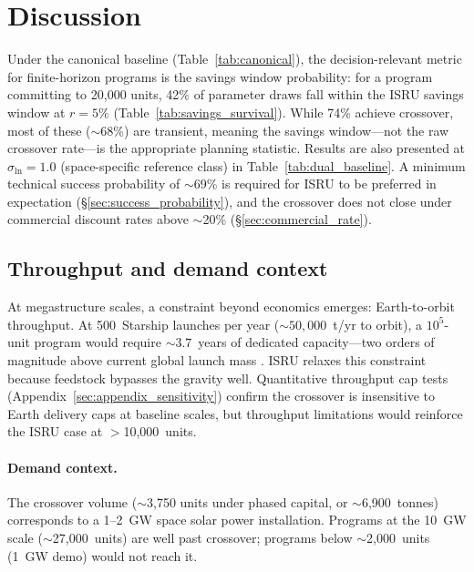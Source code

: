 \documentclass[preprint,12pt]{elsarticle}
\begin{document}
\section{Discussion}
\label{sec:discussion}

Under the canonical baseline (Table~\ref{tab:canonical}), the decision-relevant metric for finite-horizon programs is the savings window probability: for a program committing to 20{,}000 units, 42\% of parameter draws fall within the ISRU savings window at $r = 5\%$ (Table~\ref{tab:savings_survival}). While 74\% achieve crossover, most of these (${\sim}$68\%) are transient, meaning the savings window---not the raw crossover rate---is the appropriate planning statistic. Results are also presented at $\sigma_{\ln} = 1.0$ (space-specific reference class) in Table~\ref{tab:dual_baseline}. A minimum technical success probability of $\sim$69\% is required for ISRU to be preferred in expectation (\S\ref{sec:success_probability}), and the crossover does not close under commercial discount rates above $\sim$20\% (\S\ref{sec:commercial_rate}).

\subsection{Throughput and demand context}
\label{sec:throughput}

At megastructure scales, a constraint beyond economics emerges: Earth-to-orbit throughput. At 500~Starship launches per year (${\sim}50{,}000$~t/yr to orbit), a $10^5$-unit program would require ${\sim}3.7$~years of dedicated capacity---two orders of magnitude above current global launch mass \cite{jones2022}. ISRU relaxes this constraint because feedstock bypasses the gravity well. Quantitative throughput cap tests (Appendix~\ref{sec:appendix_sensitivity}) confirm the crossover is insensitive to Earth delivery caps at baseline scales, but throughput limitations would reinforce the ISRU case at $>$10{,}000~units.

\paragraph{Demand context.} The crossover volume ($\sim$3{,}750 units under phased capital, or $\sim$6{,}900~tonnes) corresponds to a 1--2~GW space solar power installation. Programs at the 10~GW scale ($\sim$27,000~units) are well past crossover; programs below $\sim$2,000~units (1~GW demo) would not reach it.
\end{document}
